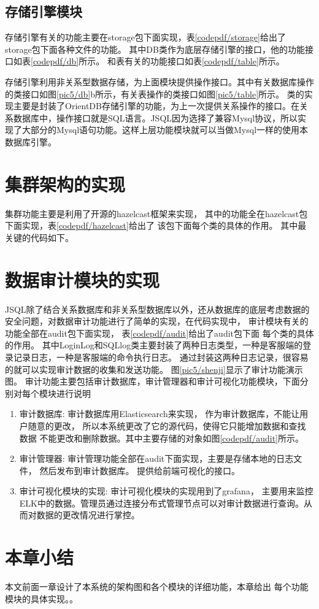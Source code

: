 \subsection{存储引擎模块}
存储引擎有关的功能主要在storage包下面实现，表\ref{codepdf/storage}给出了
storage包下面各种文件的功能。
其中DB类作为底层存储引擎的接口，他的功能接口如表\ref{codepdf/db}所示。
和表有关的功能接口如表\ref{codepdf/table}所示。

存储引擎利用非关系型数据存储，为上面模块提供操作接口。其中有关数据库操作的类接口如图\ref{pic5/db}b所示，有关表操作的类接口如图\ref{pic5/table}所示。
类的实现主要是封装了OrientDB存储引擎的功能，为上一次提供关系操作的接口。在关系数据库中，操作接口就是SQL语言。JSQL因为选择了兼容Mysql协议，所以实现了大部分的Mysql语句功能。这样上层功能模块就可以当做Mysql一样的使用本数据库引擎。
\section{集群架构的实现}
集群功能主要是利用了开源的hazelcast框架来实现，
其中的功能全在hazelcast包下面实现，表\ref{codepdf/hazelcast}给出了
该包下面每个类的具体的作用。
其中最关键的代码如下。



\section{数据审计模块的实现}
JSQL除了结合关系数据库和非关系型数据库以外，还从数据库的底层考虑数据的安全问题，对数据审计功能进行了简单的实现，在代码实现中，
审计模块有关的功能全部在audit包下面实现，
表\ref{codepdf/audit}给出了audit包下面
每个类的具体的作用。
其中LoginLog和SQLlog类主要封装了两种日志类型，一种是客服端的登录记录日志，一种是客服端的命令执行日志。
通过封装这两种日志记录，很容易的就可以实现审计数据的收集和发送功能。
图\ref{pic5/shenji}显示了审计功能演示图。
审计功能主要包括审计数据库，审计管理器和审计可视化功能模块，下面分别对每个模块进行说明
\begin{enumerate}[fullwidth,itemindent=2em,listparindent=2em]
	\item 审计数据库:
	审计数据库用Elasticsearch来实现，
	作为审计数据库，不能让用户随意的更改，
	所以本系统更改了它的源代码，使得它只能增加数据和查找数据
	不能更改和删除数据。其中主要存储的对象如图\ref{codepdf/audit}所示。
	\item 审计管理器:
	审计管理功能全部在audit下面实现，主要是存储本地的日志文件，
	然后发布到审计数据库。
	提供给前端可视化的接口。
	\item 审计可视化模块的实现:
	审计可视化模块的实现用到了grafana，
	主要用来监控ELK中的数据。管理员通过连接分布式管理节点可以对审计数据进行查询。从而对数据的更改情况进行掌控。
\end{enumerate}
\section{本章小结}
本文前面一章设计了本系统的架构图和各个模块的详细功能，本章给出
每个功能模块的具体实现。。